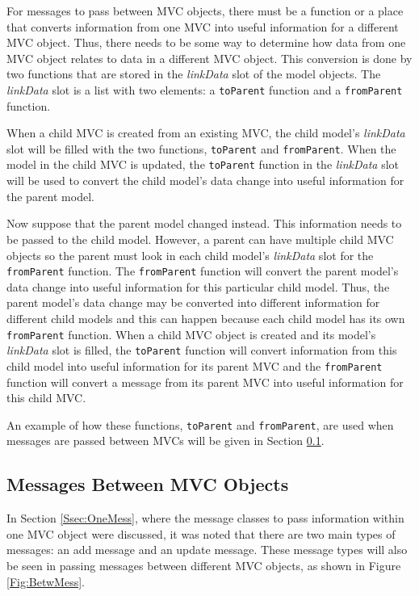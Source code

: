 \documentclass{article}[11pt]
\newcommand{\Rfunction}[1]{{\texttt{#1}}}
\newcommand{\Rslot}[1]{\textsl{#1}}
\begin{document}
For messages to pass between MVC objects, there must be a function or a place
that converts information from one MVC into useful information for a different
MVC object.  Thus, there needs to be some way to determine how data from one
MVC object relates to data in a different MVC object.  This conversion is done
by two functions that are stored in the \Rslot{linkData} slot of the model
objects.  The \Rslot{linkData} slot is a list with two elements: a
\Rfunction{toParent} function and a \Rfunction{fromParent} function.  

When a child MVC is created from an existing MVC, the child model's
\Rslot{linkData} slot will be filled with the two functions,
\Rfunction{toParent} and \Rfunction{fromParent}.  When the model in the child
MVC is updated, the \Rfunction{toParent} function in the \Rslot{linkData} slot
will be used to convert the child model's data change into useful information
for the parent model.  

Now suppose that the parent model changed instead.  This information
needs to be passed to the child model.  However, a parent can have multiple
child MVC objects so the parent must look in each child model's
\Rslot{linkData} slot for the \Rfunction{fromParent} function.  The
\Rfunction{fromParent} function will convert the parent model's data change
into useful information for this particular child model.  Thus, the parent
model's data change may be converted into different information for different
child models and this can happen because each child model has its own
\Rfunction{fromParent} function.  When a child MVC object is created and
its model's \Rslot{linkData} slot is filled, the \Rfunction{toParent} function
will convert information from this child model into useful information for its
parent MVC and the \Rfunction{fromParent} function will convert a message
from its parent MVC into useful information for this child MVC.

An example of how these functions, \Rfunction{toParent} and
\Rfunction{fromParent}, are used when messages are passed between MVCs will
be given in Section \ref{Ssec:MultMess}.

\subsection{Messages Between MVC Objects}\label{Ssec:MultMess}

In Section \ref{Ssec:OneMess}, where the message classes to pass information
within one MVC object were discussed, it was noted that there are two main
types of messages: an add message and an update message.  These message types
will also be seen in passing messages between different MVC objects, as shown
in Figure \ref{Fig:BetwMess}.  
\end{document}
